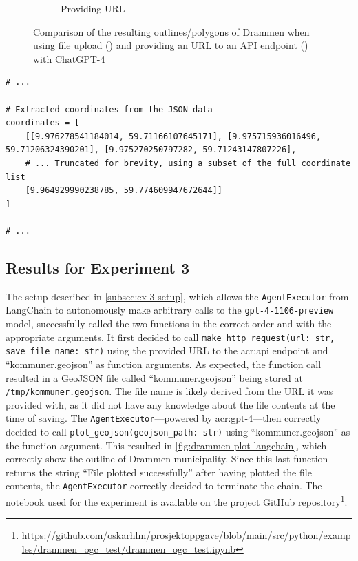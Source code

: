 \begin{figure}
\begin{subfigure}{0.45\textwidth}
        \caption{Providing URL}
        \label{subfig:drammen-outline-api}
    \end{subfigure}
    \caption{Comparison of the resulting outlines/polygons of Drammen when using file upload () and providing an URL to an API endpoint () with ChatGPT-4}
    \label{fig:file-upload-api-comparison}
\end{figure}

\begin{minipage}{\linewidth}
    \begin{lstlisting}[style=python, caption=ChatGPT code that truncates coordinates, label=lst:python-for-failed-drammen-outline]
# ...

# Extracted coordinates from the JSON data
coordinates = [
    [[9.976278541184014, 59.71166107645171], [9.975715936016496, 59.71206324390201], [9.975270250797282, 59.71243147807226], 
    # ... Truncated for brevity, using a subset of the full coordinate list
    [9.964929990238785, 59.774609947672644]]
]

# ...
\end{lstlisting}
\end{minipage}

\subsection{Results for Experiment 3}\label{subsec:experiment-3-results}

The setup described in \autoref{subsec:ex-3-setup}, which allows the \texttt{AgentExecutor} from LangChain to autonomously make arbitrary calls to the \texttt{gpt-4-1106-preview} model, successfully called the two functions in the correct order and with the appropriate arguments. It first decided to call \texttt{make\_http\_request(url: str, save\_file\_name: str)} using the provided URL to the \acrshort{acr:api} endpoint and \enquote{kommuner.geojson} as function arguments. As expected, the function call resulted in a GeoJSON file called \enquote{kommuner.geojson} being stored at \texttt{/tmp/kommuner.geojson}. The file name is likely derived from the URL it was provided with, as it did not have any knowledge about the file contents at the time of saving. The \texttt{AgentExecutor}---powered by \acrshort{acr:gpt}-4---then correctly decided to call \texttt{plot\_geojson(geojson\_path: str)} using \enquote{kommuner.geojson} as the function argument. This resulted in \autoref{fig:drammen-plot-langchain}, which correctly show the outline of Drammen municipality. Since this last function returns the string \enquote{File plotted successfully} after having plotted the file contents, the \texttt{AgentExecutor} correctly decided to terminate the chain. The notebook used for the experiment is available on the project GitHub repository\footnote{\url{https://github.com/oskarhlm/prosjektoppgave/blob/main/src/python/examples/drammen_ogc_test/drammen_ogc_test.ipynb}}.

